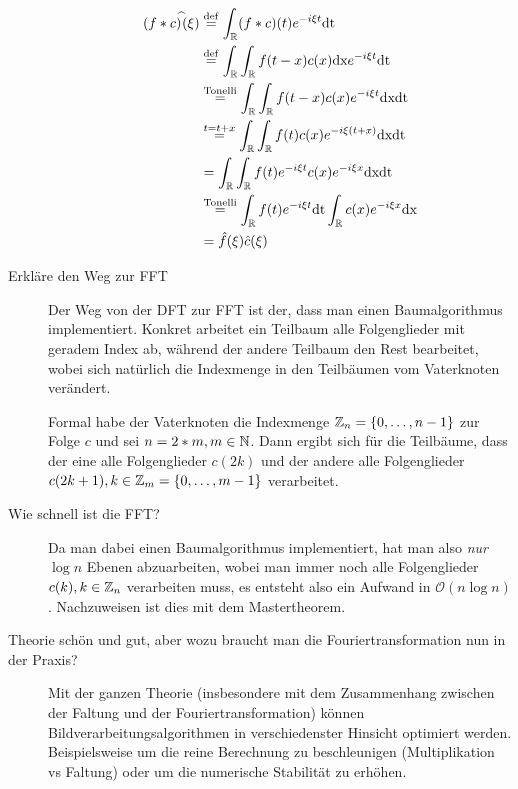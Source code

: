 \begin{description}
    \begin{equation*}
      \begin{split}
        (f*c)^{\widehat{}}(\xi) &\stackrel{\mathrm{def}}= \int_{\mathbb{R}} (f*c)(t) e^{-i\xi t}\text{dt} \\
        &\stackrel{\mathrm{def}}= \int_{\mathbb{R}} \int_{\mathbb{R}} f(t-x)c(x)\text{dx} e^{-i\xi t} \text{dt} \\
        &\stackrel{\mathrm{Tonelli}}= \int_{\mathbb{R}} \int_{\mathbb{R}} f(t-x)c(x) e^{-i\xi t} \text{dx}\text{dt} \\
        &\stackrel{t=t+x}= \int_{\mathbb{R}} \int_{\mathbb{R}} f(t)c(x) e^{-i\xi (t+x)} \text{dx}\text{dt} \\
        &= \int_{\mathbb{R}} \int_{\mathbb{R}} f(t)e^{-i\xi t} c(x) e^{-i\xi x} \text{dx}\text{dt} \\
        &\stackrel{\mathrm{Tonelli}}= \int_{\mathbb{R}} f(t)e^{-i\xi t} \text{dt}\int_{\mathbb{R}} c(x) e^{-i\xi x} 
        \text{dx} \\ 
        &= \hat f(\xi) \hat c(\xi)
      \end{split}
    \end{equation*}

	\item[Erkläre den Weg zur FFT]
      Der Weg von der DFT zur FFT ist der, dass man einen Baumalgorithmus implementiert. Konkret arbeitet
      ein Teilbaum alle Folgenglieder mit geradem Index ab, während der andere Teilbaum den Rest bearbeitet,
      wobei sich natürlich die Indexmenge in den Teilbäumen vom Vaterknoten verändert.

      Formal habe der Vaterknoten die Indexmenge $\mathbb{Z}_n = \{0,\ldots,n-1\}$ zur Folge $c$ und sei $n=2*m, m\in\mathbb{N}$.
      Dann ergibt sich für die Teilbäume, dass der eine alle Folgenglieder $c(2k)$ und der andere alle Folgenglieder
      $c(2k+1), k \in \mathbb{Z}_m = \{0,\ldots,m-1\}$ verarbeitet.
	\item[Wie schnell ist die FFT?]
      Da man dabei einen Baumalgorithmus implementiert, hat man also \emph{nur} $\log n$ Ebenen abzuarbeiten, wobei
      man immer noch alle Folgenglieder $c(k),k\in\mathbb{Z}_n$ verarbeiten muss, es entsteht also ein Aufwand 
      in $\mathcal{O}(n \log n)$. Nachzuweisen ist dies mit dem Mastertheorem.
    \item[Theorie schön und gut, aber wozu braucht man die Fouriertransformation nun in der Praxis?]
      Mit der ganzen Theorie (insbesondere mit dem Zusammenhang zwischen der Faltung und der Fouriertransformation)
      können Bildverarbeitungsalgorithmen in verschiedenster Hinsicht optimiert werden. Beispielsweise
      um die reine Berechnung zu beschleunigen (Multiplikation vs Faltung) oder um die numerische Stabilität
      zu erhöhen.


\end{description}
